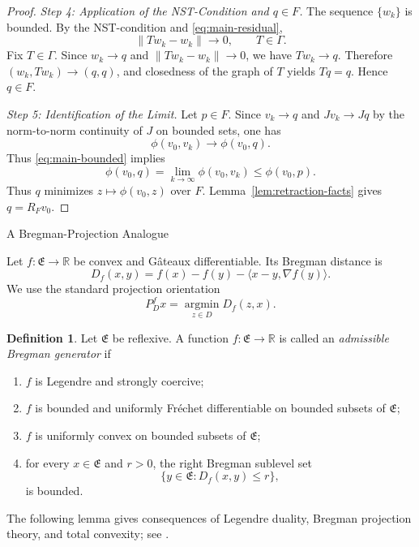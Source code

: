 \documentclass[leqno,12pt]{amsart}
\makeatletter
\def\R{\mathbb{R}}
\theoremstyle{definition}
\newtheorem{definition}[theorem]{Definition}
\theoremstyle{remark}
\numberwithin{equation}{section}
\newcommand{\E}{\mathfrak{E}}
\def\section{\@startsection{section}{1}%
  \z@{.7\linespacing\@plus\linespacing}{.5\linespacing}%
  {\normalfont\bfseries\centering}}
\makeatother
\begin{document}
\begin{proof}
\smallskip
\noindent\emph{Step 4: Application of the NST-Condition and $q\in F$.}
The sequence $\{w_k\}$ is bounded. By the NST-condition and \eqref{eq:main-residual},
\[
 \|Tw_k-w_k\|\to0,
 \qquad T\in\Gamma.
\]
Fix $T\in\Gamma$. Since $w_k\to q$ and $\|Tw_k-w_k\|\to0$, we have $Tw_k\to q$. Therefore $(w_k,Tw_k)\to(q,q)$, and closedness of the graph of $T$ yields $Tq=q$. Hence $q\in F$.

\smallskip
\noindent\emph{Step 5: Identification of the Limit.}
Let $p\in F$. Since $v_k\to q$ and $Jv_k\to Jq$ by the
norm-to-norm continuity of $J$ on bounded sets, one has
\[
 \phi(v_0,v_k)\to\phi(v_0,q).
\]
Thus \eqref{eq:main-bounded} implies
\[
 \phi(v_0,q)=\lim_{k\to\infty}\phi(v_0,v_k)\leq\phi(v_0,p).
\]
Thus $q$ minimizes $z\mapsto\phi(v_0,z)$ over $F$. Lemma~\ref{lem:retraction-facts} gives $q=R_Fv_0$.
\end{proof}

\section{A Bregman-Projection Analogue}\label{sec:bregman}

Let $f:\E\to\R$ be convex and G\^ateaux differentiable. Its Bregman distance is
\[
 D_f(x,y)=f(x)-f(y)-\langle x-y,\nabla f(y)\rangle.
\]
We use the standard projection orientation
\[
 P_D^f x=\operatorname*{argmin}_{z\in D}D_f(z,x).
\]

\begin{definition}\label{def:admissible-bregman}
Let $\E$ be reflexive. A function $f:\E\to\R$ is called an \emph{admissible Bregman generator} if
\begin{enumerate}
 \item $f$ is Legendre and strongly coercive;
 \item $f$ is bounded and uniformly Fr\'echet differentiable on bounded subsets of $\E$;
 \item $f$ is uniformly convex on bounded subsets of $\E$;
 \item for every $x\in\E$ and $r>0$, the right Bregman sublevel set
 \[
  \{y\in\E:D_f(x,y)\leq r\},
 \]
 is bounded.
\end{enumerate}
\end{definition}

The following lemma gives consequences of Legendre duality,
Bregman projection theory, and total convexity; see
\cite{AlberButnariu1997,BauschkeBorwein1997,ButnariuIusem2000,
ButnariuIusemZalinescu2003,ButnariuResmerita2006}.
\end{document}
